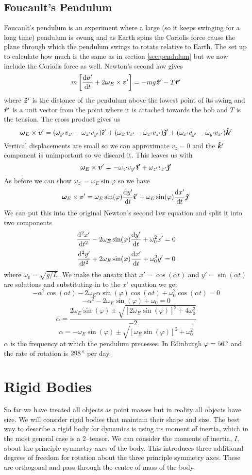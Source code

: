 \documentclass{article}
\newcommand{\vk}{\vh k}
\begin{document}
    \subsection{Foucault's Pendulum}
    Foucault's pendulum is an experiment where a large (so it keeps swinging for a long time) pendulum is swung and as Earth spins the Coriolis force cause the plane through which the pendulum swings to rotate relative to Earth.
    The set up to calculate how much is the same as in section \ref{sec:pendulum} but we now include the Coriolis force as well.
    Newton's second law gives
    \[m\left[\dv{\bm{v}'}{t} + 2\bm{\omega}_E\times\bm{v}'\right] = -mg\bm{\hat{z}}' - T\bm{\hat{r}}'\]
    where \(\bm{\hat{z}}'\) is the distance of the pendulum above the lowest point of its swing and \(\bm{\hat{r}}'\) is a unit vector from the point where it is attached towards the bob and \(T\) is the tension.
    The cross product gives us
    \[\vv\omega_E\times\vv v' = (\omega_{y'}v_{z'} - \omega_{z'}v_{y'})\vi' + (\omega_{z'}v_{x'} - \omega_{x'}v_{z'})\vj' + (\omega_{x'}v_{y'} - \omega_{y'}v_{x'})\vk'\]
    Vertical displacements are small so we can approximate \(v_z = 0\) and the \(\vk'\) component is unimportant so we discard it.
    This leaves us with
    \[\bm{\omega}_E\times\bm{v}' = -\omega_{z'}v_{y'}\bm{\hat{\imath}}' + \omega_{z'}v_{x'}\bm{\hat{\jmath}}'\]
    As before we can show \(\omega_{z'} = \omega_E\sin\varphi\) so we have
    \[\bm{\omega}_E\times\bm{v}' =\omega_E\sin(\varphi)\dv{y'}{t}\bm{\hat{\imath}}' + \omega_E\sin(\varphi)\dv{x'}{t}\bm{\hat{\jmath}}'\]
    We can put this into the original Newton's second law equation and split it into two components
    \[\dv[2]{x'}{t} - 2\omega_E\sin(\varphi)\dv{y'}{t} + \omega_0^2x' = 0\]
    \[\dv[2]{y'}{t} + 2\omega_E\sin(\varphi)\dv{x'}{t} + \omega_0^2y' = 0\]
    where \(\omega_0 = \sqrt{g/L}\).
    We make the ansatz that \(x' = \cos(\alpha t)\) and \(y' = \sin(\alpha t)\) are solutions and substituting in to the \(x'\) equation we get
    \[-\alpha^2\cos(\alpha t) - 2\omega_E\alpha\sin(\varphi)\cos(\alpha t) + \omega_0^2\cos(\alpha t) = 0\]
    \[-\alpha^2 - 2\omega_E\sin(\varphi) + \omega_0 = 0\]
    \[\alpha = \frac{2\omega_E\sin(\varphi) \pm \sqrt{[2\omega_E\sin(\varphi)]^2 + 4\omega_0^2}}{-2}\]
    \[\alpha = -\omega_E\sin(\varphi) \pm \sqrt{[\omega_E\sin(\varphi)]^2 + \omega_0^2}\]
    \(\alpha\) is the frequency at which the pendulum precesses.
    In Edinburgh \(\varphi = \SI{56}{\SIUnitSymbolDegree}\) and the rate of rotation is \(\SI{298}{\SIUnitSymbolDegree}\) per day.
    
    \section{Rigid Bodies}
    So far we have treated all objects as point masses but in reality all objects have size.
    We will consider rigid bodies that maintain their shape and size.
    The best way to describe a rigid body for dynamics is using its moment of inertia, which in the most general case is a 2--tensor.
    We can consider the moments of inertia, \(I\), about the principle symmetry axes of the body.
    This introduces three additional degrees of freedom for rotation about the three principle symmetry axes.
    These are orthogonal and pass through the centre of mass of the body.
    
\end{document}
